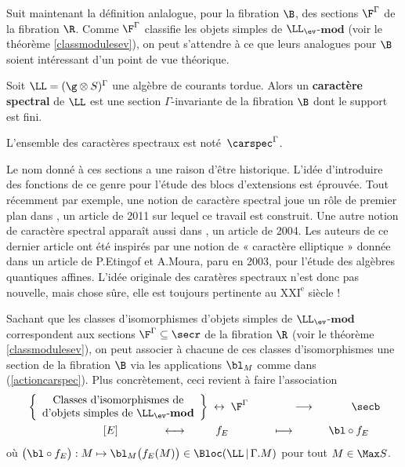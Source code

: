 Suit maintenant la définition anlalogue, pour la fibration $\B$, des sections $\F^\Gamma$ de la fibration $\R$. Comme $\F^\Gamma$ classifie les objets simples de $\LL_{\ev}$-$\mathbf{mod}$ (voir le théorème \ref{classmodulesev}), on peut s'attendre à ce que leurs analogues pour $\B$ soient intéressant d'un point de vue théorique.

\begin{Def} Soit $\LL = (\g \otimes S)^\Gamma$ une algèbre de courants tordue. Alors un \textbf{caractère spectral} de $\LL$ est une section $\Gamma$-invariante de la fibration $\B$ dont le support est fini.

L'ensemble des caractères spectraux est noté $\,\carspec^\Gamma$.
\end{Def}

\begin{Rem} Le nom donné à ces sections a une raison d'être historique. L'idée d'introduire des fonctions de ce genre pour l'étude des blocs d'extensions est éprouvée. Tout récemment par exemple, une notion de caractère spectral joue un rôle de premier plan dans \cite{NSext}, un article de 2011 sur lequel ce travail est construit. Une autre notion de caractère spectral apparaît aussi dans \cite{CMspec}, un article de 2004. Les auteurs de ce dernier article ont été inspirés par une notion de « caractère elliptique » donnée dans un article de P.Etingof et A.Moura, paru en 2003, pour l'étude des algèbres quantiques affines. L'idée originale des caratères spectraux n'est donc pas nouvelle, mais chose sûre, elle est toujours pertinente au $\text{XXI}^{\text{e}}$ siècle ! 
\end{Rem}

Sachant que les classes d'isomorphismes d'objets simples de $\LL_{\ev}$-$\mathbf{mod}$ correspondent aux sections $\F^\Gamma \subseteq \secr$ de la fibration $\R$ (voir le théorème \ref{classmodulesev}), on peut associer à chacune de ces classes d'isomorphismes une section de la fibration $\B$ via les applications $\bl_M$ comme dans (\ref{actioncarspec}). Plus concrètement, ceci revient à faire l'association
\begin{align*} 
&\left\{\begin{array}{c} \text{Classes d'isomorphismes de}\\
\text{d'objets simples de $\LL_{\ev}$-$\mathbf{mod}$} \end{array}\right\} \; \leftrightarrow \; \F^\Gamma \qquad \qquad \longrightarrow \qquad \quad \; \secb\\
&\qquad \qquad \qquad \quad [E] \qquad \qquad \longleftrightarrow \qquad \;\; f_E \qquad \qquad \longmapsto \qquad \quad \bl \circ f_E 
\end{align*}
où $\big(\bl \circ f_E\big) : M \mapsto \bl_M\big(f_E(M)\big) \in \Bloc(\LL \, | \, \Gamma.M)$ pour tout $M \in \Max S$.

